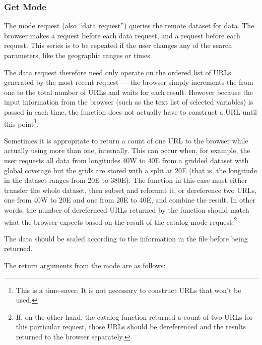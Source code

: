 \subsubsection{Get Mode}

The  mode request (also ``data request'') queries the remote
dataset for data.  The browser makes a  request before
  each data request,
and a  request before each  request.  This
series is to be repeated if the user changes any of the search
parameters, like the geographic ranges or times.

The data request therefore need only operate on the ordered list of
URLs generated by the most recent  request --- the browser
simply increments the  from one to the total
number of URLs and waits for each result.  However because the input
information from the browser (such as the text list of selected
variables) is passed in each time, the  function does not
actually have to construct a URL until this point\footnote{This is a
time-saver.  It is not necessary to construct URLs that won't be
used.}.

Sometimes it is appropriate to return a count of one URL to the
browser while actually using more than one, internally.  This can
occur when, for example, the user requests all data from longitudes
40W to 40E from a gridded dataset with global coverage but the grids
are stored with a split at 20E (that is, the longitude in the dataset
ranges from 20E to 380E).  The  function in this case must
either transfer the whole dataset, then subset and reformat it, or
dereference two URLs, one from 40W to 20E and one from 20E to 40E, and
combine the result.  In other words, the number of derefernced URLs
returned by the  function should match what the browser
expects based on the result of the catalog mode request.\footnote{If,
on the other hand, the catalog function returned a count of two URLs
for this particular request, those URLs should be dereferenced and the
results returned to the browser separately.}

The data should be scaled according to the  information
in the  file before being returned. 

\smallbreak

The return arguments from the  mode are as follows:

\nopagebreak


